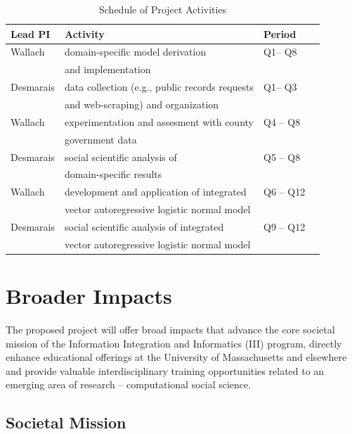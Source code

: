 \begin{table}[h]
\caption{Schedule of Project Activities}
\begin{center}
\begin{tabular}{|l|l|l|l|}
\hline
{\bf Lead PI} & {\bf Activity} & {\bf Period} \\ \hline
Wallach & domain-specific model derivation   &   Q1-- Q8 \\
& and implementation &  \\ \hline
Desmarais & data collection (e.g., public records requests  & Q1-- Q3 \\
&  and web-scraping)  and organization & \\ \hline
Wallach & experimentation and assesment with county & Q4 -- Q8 \\
&  government data & \\ \hline
Desmarais & social scientific analysis  of & Q5 -- Q8 \\
& domain-specific results & \\ \hline
Wallach & development and application of integrated & Q6 -- Q12 \\
& vector autoregressive logistic normal model & \\ \hline
Desmarais & social scientific analysis of integrated & Q9 -- Q12 \\
& vector autoregressive logistic normal model & \\ \hline

\end{tabular}
\end{center}
\label{schedule}
\end{table}%



\section{Broader Impacts}

The proposed project will offer broad impacts that advance the core societal mission of the Information Integration and Informatics (III) program, directly enhance educational offerings at the University of Massachusetts and elsewhere and provide valuable interdisciplinary training opportunities related to an emerging area of research -- computational social science.

\subsection{Societal Mission}

